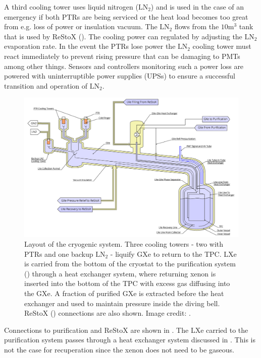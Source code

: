 A third cooling tower uses liquid nitrogen ($\mathrm{LN_2}$) and is used in the case of an emergency if both PTRs are being serviced or the
heat load becomes too great from e.g. loss of power or insulation vacuum.  The $\mathrm{LN_2}$ flows from the $10 \mathrm{m^3}$ tank that
is used by ReStoX ().  The cooling power can regulated by adjusting the $\mathrm{LN_2}$ evaporation rate.  In the event the PTRs
lose power the $\mathrm{LN_2}$ cooling tower must react immediately to prevent rising pressure that can be damaging to PMTs among other
things.  Sensors and controllers monitoring such a power loss are powered with uninterruptible power supplies (UPSs) to ensure a successful
transition and operation of $\mathrm{LN_2}$.

\begin{figure}
\centering
\includegraphics[width=\textwidth]{CryostatSchematic}
\caption{Layout of the cryogenic system.  Three cooling towers - two with PTRs and one backup $\mathrm{LN_2}$ - liquify GXe to return to
the TPC.  LXe is carried from the bottom of the cryostat to the purification system () through a heat exchanger
system, where
returning xenon is inserted into the bottom of the TPC with excess gas diffusing into the GXe.  A fraction of purified GXe is extracted
before the heat exchanger and used to maintain pressure inside the diving bell.  ReStoX () connections are
also shown.  Image credit: .}
\label{fig:xenon1t_cryogenics_schematic}
\end{figure}

Connections to purification and ReStoX are shown in .  The LXe carried to the purification system
passes through a heat exchanger system discussed in .  This is not the case for recuperation since the xenon
does not need to be gaseous.

